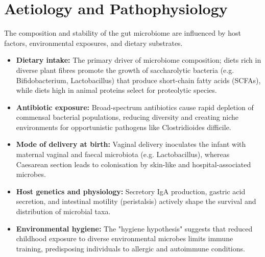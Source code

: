 \section*{Aetiology and Pathophysiology}
The composition and stability of the gut microbiome are influenced by host factors, environmental exposures, and dietary substrates.
\begin{itemize}
    \item \textbf{Dietary intake:} The primary driver of microbiome composition; diets rich in diverse plant fibres promote the growth of saccharolytic bacteria (e.g. Bifidobacterium, Lactobacillus) that produce short-chain fatty acids (SCFAs), while diets high in animal proteins select for proteolytic species.
    \item \textbf{Antibiotic exposure:} Broad-spectrum antibiotics cause rapid depletion of commensal bacterial populations, reducing diversity and creating niche environments for opportunistic pathogens like Clostridioides difficile.
    \item \textbf{Mode of delivery at birth:} Vaginal delivery inoculates the infant with maternal vaginal and faecal microbiota (e.g. Lactobacillus), whereas Caesarean section leads to colonisation by skin-like and hospital-associated microbes.
    \item \textbf{Host genetics and physiology:} Secretory IgA production, gastric acid secretion, and intestinal motility (peristalsis) actively shape the survival and distribution of microbial taxa.
    \item \textbf{Environmental hygiene:} The "hygiene hypothesis" suggests that reduced childhood exposure to diverse environmental microbes limits immune training, predisposing individuals to allergic and autoimmune conditions.
\end{itemize}

